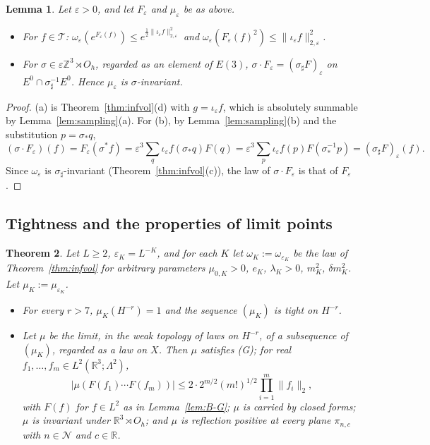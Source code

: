 \documentclass[11pt]{amsart}
\theoremstyle{plain}
\newtheorem{theorem}{Theorem}[section]
\newtheorem{lemma}[theorem]{Lemma}
\theoremstyle{definition}
\theoremstyle{remark}
\numberwithin{equation}{section}
\newcommand{\R}{\mathbb{R}}
\newcommand{\Z}{\mathbb{Z}}
\newcommand{\eps}{\varepsilon}
\newcommand{\cN}{\mathcal{N}}
\newcommand{\cT}{\mathcal{T}}
\newcommand{\Oh}{O_h}
\newcommand{\Eu}{E(3)}
\newcommand{\abs}[1]{\lvert #1\rvert}
\newcommand{\norm}[1]{\lVert #1\rVert}
\begin{document}
\begin{lemma}\label{lem:field}
Let $\eps>0$, and let $F_\eps$ and $\mu_\eps$ be as above.
\begin{itemize}
\item[(a)] For $f\in\cT$: $\omega_\eps(e^{F_\eps(f)})\le e^{\frac12\norm{\iota_\eps f}_{2,\eps}^2}$ and $\omega_\eps(F_\eps(f)^2)\le\norm{\iota_\eps f}^2_{2,\eps}$.
\item[(b)] For $\sigma\in\eps\Z^3\rtimes\Oh$, regarded as an element of $\Eu$, $\sigma\cdot F_\eps=(\sigma_\sharp F)_\eps$ on $E^0\cap\sigma_\sharp^{-1}E^0$. Hence $\mu_\eps$ is $\sigma$-invariant.
\end{itemize}
\end{lemma}

\begin{proof}
(a) is Theorem~\ref{thm:infvol}(d) with $g=\iota_\eps f$, which is absolutely summable by Lemma~\ref{lem:sampling}(a). For (b), by Lemma~\ref{lem:sampling}(b) and the substitution $p=\sigma_*q$,
\[
(\sigma\cdot F_\eps)(f)=F_\eps(\sigma^*f)=\eps^3\sum_q\iota_\eps f(\sigma_*q)F(q)=\eps^3\sum_p\iota_\eps f(p)F(\sigma^{-1}_*p)=(\sigma_\sharp F)_\eps(f).
\]
Since $\omega_\eps$ is $\sigma_\sharp$-invariant (Theorem~\ref{thm:infvol}(c)), the law of $\sigma\cdot F_\eps$ is that of $F_\eps$.
\end{proof}

\subsection{Tightness and the properties of limit points}

\begin{theorem}\label{thm:cont}
Let $L\ge2$, $\eps_K=L^{-K}$, and for each $K$ let $\omega_K:=\omega_{\eps_K}$ be the law of Theorem~\ref{thm:infvol} for arbitrary parameters $\mu_{0,K}>0$, $e_K$, $\lambda_K>0$, $m^2_K$, $\delta m^2_K$. Let $\mu_K:=\mu_{\eps_K}$.
\begin{itemize}
\item[(a)] For every $r>7$, $\mu_K(H^{-r})=1$ and the sequence $(\mu_K)$ is tight on $H^{-r}$.
\item[(b)] Let $\mu$ be the limit, in the weak topology of laws on $H^{-r}$, of a subsequence of $(\mu_K)$, regarded as a law on $X$. Then $\mu$ satisfies (G); for real $f_1,\dots,f_m\in L^2(\R^3;\Lambda^2)$,
\[
\abs{\mu(F(f_1)\cdots F(f_m))}\le2\cdot2^{m/2}(m!)^{1/2}\prod_{i=1}^m\norm{f_i}_2 ,
\]
with $F(f)$ for $f\in L^2$ as in Lemma~\ref{lem:B-G}; $\mu$ is carried by closed forms; $\mu$ is invariant under $\R^3\rtimes\Oh$; and $\mu$ is reflection positive at every plane $\pi_{n,c}$ with $n\in\cN$ and $c\in\R$.
\end{itemize}
\end{theorem}
\end{document}
